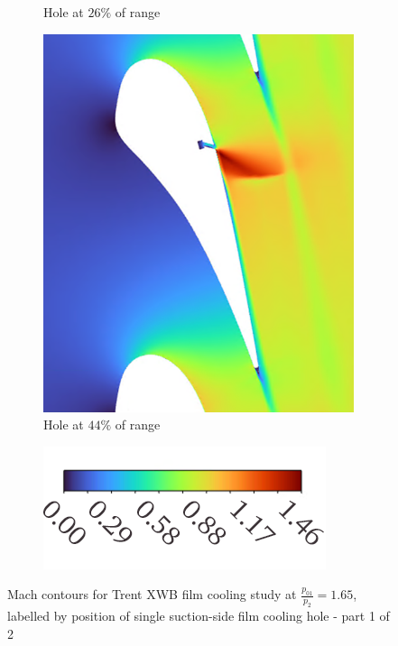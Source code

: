 \documentclass[a4paper, 11pt, oneside]{report}
\begin{document}
\begin{figure}[H]
\begin{subfigure}{.42\textwidth}
		\caption{Hole at $26\%$ of range}
	\end{subfigure}
	\hspace{0.05\textwidth}
	\begin{subfigure}{.42\textwidth}
		\centering
		\includegraphics[width=\linewidth]{figs/sch_mach_contours_3.png}
		\caption{Hole at $44\%$ of range}
	\end{subfigure}
	\begin{subfigure}{.4\textwidth}
		\centering
		\includegraphics[width=\linewidth]{figs/mach_legend_sch_horizontal.png}
	\end{subfigure}
	\caption{Mach contours for Trent XWB film cooling study at $\frac{p_{01}}{p_2}=1.65$, labelled by position of single suction-side film cooling hole - part 1 of 2}
	\label{fig:sch_mach_0-3}
\end{figure}
\end{document}

